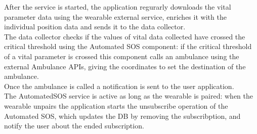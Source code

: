 After the service is started, the application regurarly downloads the vital parameter data using the wearable external service, enriches it with the individual position data and sends it to the data collector.\\
The data collector checks if the values of vital data collected have crossed the critical threshold using the Automated SOS component: if the critical threshold of a vital parameter is crossed this component calls an ambulance using the external Ambulance APIs, giving the coordinates to set the destination of the ambulance.\\
Once the ambulance is called a notification is sent to the user application.\\
The AutomatedSOS service is active as long as the wearable is paired: when the wearable unpairs the application starts the unsubscribe operation of the Automated SOS, which updates the DB by removing the subscribption, and notify the user about the ended subscription.



